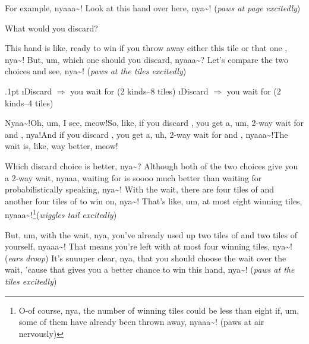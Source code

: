 \bigskip

For example, nyaaa\textasciitilde! Look at this hand over here, nya\textasciitilde! (\textit{paws at page
excitedly})

\begin{screen}
\bp
{}
\ep
\vspace{-10pt}What would you discard? \vspace{-5pt}
\end{screen}

\bigskip
\noindent

This hand is like, ready to win if you throw away either this tile {} or that one {}, nya\textasciitilde!
But, um, which one should you discard, nyaaa\textasciitilde? Let’s compare the two choices and
see, nya\textasciitilde! (\textit{paws at the tiles excitedly})

\bi\itemsep.1pt
\i Discard {} $\Rightarrow$ you wait for { \mahjong[15pt]{8p]}} (2 kinds--8 tiles)
\i Discard {} $\Rightarrow$ you wait for { \mahjong[15pt]{6p]}} (2 kinds--4 tiles)
\ei

Nyaa\textasciitilde!\@ Oh, um, I see, meow!\@  So, like, if you discard {}, you get a, um, 2-way wait for {} and {}, nya!\@ And if you discard {}, you get a, uh, 2-way wait for {} and {}, nyaaa\textasciitilde!\@ The { } wait is, like, way better, meow!\@

\bigskip


Which discard choice is better, nya\textasciitilde? Although both of the two choices give
you a 2-way wait, nyaaa, waiting for {} is soooo
much better than waiting for {}
probabilistically speaking, nya\textasciitilde! With the {} wait, there
are four tiles of {} and another four tiles
of {} to win on, nya\textasciitilde! That’s like, um, at most
eight winning tiles, nyaaa\textasciitilde!\footnote{
    O-of course, nya,
    the number of winning tiles could be less than eight if, um, some of them have
    already been thrown away, nyaaa\textasciitilde! (paws at air nervously)

}(\textit{wiggles tail excitedly})

But, um, with the {} wait, nya,
you’ve already used up two tiles of {} and two tiles of {}
yourself, nyaaa\textasciitilde! That means you’re left with at most four winning tiles, nya\textasciitilde!
(\textit{ears droop}) It’s suuuper clear, nya, that you should choose the {} wait over the {} wait, 'cause
that gives you a better chance to win this hand, nya\textasciitilde! (\textit{paws at the tiles
excitedly})

